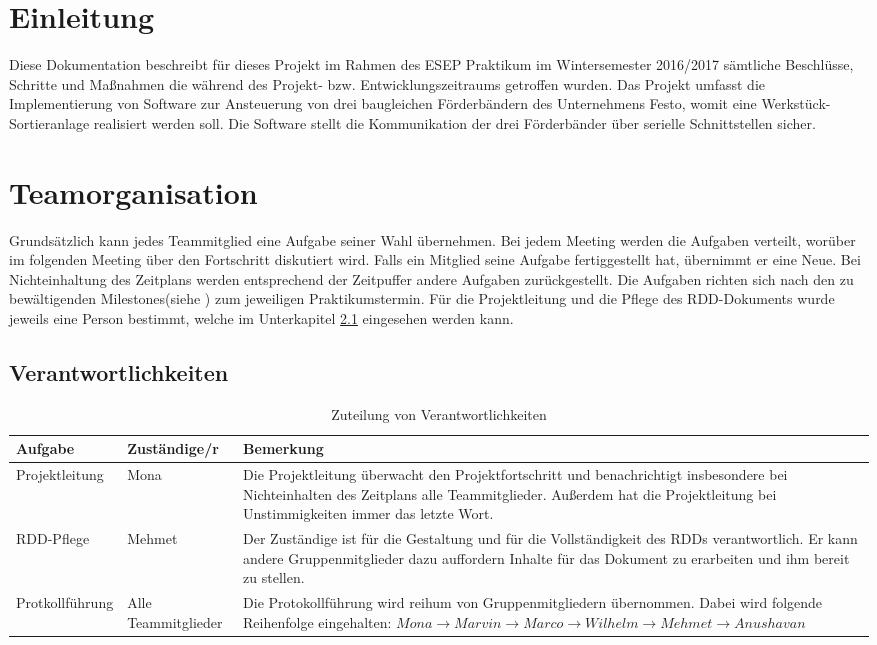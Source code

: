 \documentclass[a4paper, 11pt]{article}
\begin{document}
\newpage

\tableofcontents

\newpage

\section{Einleitung}
Diese Dokumentation beschreibt für dieses Projekt im Rahmen des ESEP Praktikum im Wintersemester 2016/2017 sämtliche Beschlüsse, Schritte und Maßnahmen die während des Projekt- bzw. Entwicklungszeitraums getroffen wurden. Das Projekt umfasst die Implementierung von Software zur Ansteuerung von drei baugleichen Förderbändern des Unternehmens Festo, womit eine Werkstück-Sortieranlage realisiert werden soll. Die Software stellt die Kommunikation der drei Förderbänder über serielle Schnittstellen sicher.

\section{Teamorganisation}
Grundsätzlich kann jedes Teammitglied eine Aufgabe seiner Wahl übernehmen. Bei jedem Meeting werden die Aufgaben verteilt, worüber im folgenden Meeting über den Fortschritt diskutiert wird. Falls ein Mitglied seine Aufgabe fertiggestellt hat, übernimmt er eine Neue. Bei Nichteinhaltung des Zeitplans werden entsprechend der Zeitpuffer andere Aufgaben zurückgestellt. Die Aufgaben richten sich nach den zu bewältigenden Milestones(siehe \cite{esep}) zum jeweiligen Praktikumstermin. Für die Projektleitung und die Pflege des RDD-Dokuments wurde jeweils eine Person bestimmt, welche im Unterkapitel \ref{vantw} eingesehen werden kann.

\subsection{Verantwortlichkeiten}\label{vantw}
\begin{table}[h]
\center
\begin{tabularx}{\textwidth}{|l|l|X|}
\hline
\textbf{Aufgabe}&\textbf{Zuständige/r}&\textbf{Bemerkung}\\
\hline
Projektleitung&Mona&Die Projektleitung überwacht den Projektfortschritt und benachrichtigt insbesondere bei Nichteinhalten des Zeitplans alle Teammitglieder. Außerdem hat die Projektleitung bei Unstimmigkeiten immer das letzte Wort. \\
\hline
RDD-Pflege&Mehmet&Der Zuständige ist für die Gestaltung und für die Vollständigkeit des RDDs verantwortlich. Er kann andere Gruppenmitglieder dazu auffordern Inhalte für das Dokument zu erarbeiten und ihm bereit zu stellen. \\
\hline 
Protkollführung&Alle Teammitglieder&Die Protokollführung wird reihum von Gruppenmitgliedern übernommen. Dabei wird folgende Reihenfolge eingehalten: $Mona\rightarrow Marvin\rightarrow Marco \rightarrow Wilhelm\rightarrow Mehmet\rightarrow Anushavan$ \\
\hline
\end{tabularx}
\caption{Zuteilung von Verantwortlichkeiten}
\label{labelname}
\end{table}
\end{document}
